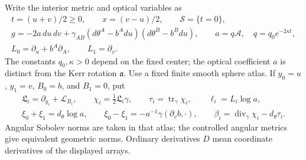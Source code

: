 Write the interior metric and optical variables as
\begin{equation}\label{bg:wedge}
\begin{gathered}
 t=(u+v)/2\ge0,\qquad x=(v-u)/2,\qquad \mathcal S=\{t=0\},\\
 g=-2a\,du\,dv+
 \gamma_{AB}(d\theta^A-b^Adu)(d\theta^B-b^Bdu),\qquad
 a=q\mathcal A,\quad q=q_0e^{-2\kappa t},\\
 L_0=\partial_u+b^A\partial_A,\qquad L_1=\partial_v.
\end{gathered}
\end{equation}
The constants $q_0,\kappa>0$ depend on the fixed center; the optical
coefficient $a$ is distinct from the Kerr rotation $\mathfrak a$.
Use a fixed finite smooth sphere atlas.  If $y_0=u$, $y_1=v$,
$B_0=b$, and $B_1=0$, put
\begin{equation}\label{bg:null-fields}
\begin{gathered}
 \mathfrak L_i=\partial_{y_i}+\mathcal L_{B_i},\qquad
 \chi_i=\tfrac12\mathfrak L_i\gamma,\qquad
 \tau_i=\operatorname{tr}_\gamma\chi_i,\qquad
 \ell_i=L_i\log a,\\
 \xi_0+\xi_1=d_\theta\log a,\qquad
 \xi_0-\xi_1=-a^{-1}\gamma(\partial_vb,\cdot),\qquad
 \beta_i=\operatorname{div}_\gamma\chi_i-d_\theta\tau_i.
\end{gathered}
\end{equation}
Angular Sobolev norms are taken in that atlas; the controlled angular
metrics give equivalent geometric norms.  Ordinary derivatives $D$
mean coordinate derivatives of the displayed arrays.

